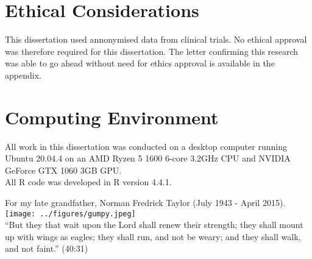 \documentclass[10pt]{report}
\begin{document}
\section*{Ethical Considerations}
This dissertation used annonymised data from clinical trials. No ethical approval was therefore required for this dissertation. The letter confirming this research was able to go ahead without need for ethics approval is available in the appendix.

\section*{Computing Environment}
All work in this dissertation was conducted on a desktop computer running Ubuntu 20.04.4 on an AMD Ryzen 5 1600 6-core 3.2GHz CPU and NVIDIA GeForce GTX 1060 3GB GPU. \\

All R code was developed in R version 4.4.1. \\

\clearpage
\begin{center}
  \thispagestyle{empty}
  \vspace*{\fill}
  For my late grandfather, Norman Fredrick Taylor (July 1943 - April 2015).\\
  \texttt{[image: ../figures/gumpy.jpeg]}\\
  ``But they that wait upon the Lord shall renew their strength; they shall mount up with wings as eagles; they shall run, and not be weary; and they shall walk, and not faint.'' (40:31)
  \vspace*{\fill}
\end{center}

\setcounter{tocdepth}{3}
\tableofcontents

\setcounter{tocdepth}{3}
\listoffigures

\setcounter{tocdepth}{3}
\listoftables























\end{document}
